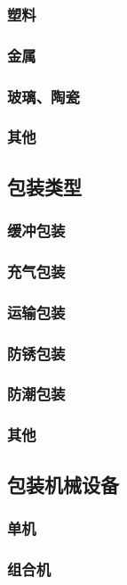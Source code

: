 \documentclass[UTF8]{../../ApplicationUniverse}
\begin{document}
        \subsubsection{塑料}
        \subsubsection{金属}
        \subsubsection{玻璃、陶瓷}
        \subsubsection{其他}
    \subsection{包装类型}
        \subsubsection{缓冲包装}
        \subsubsection{充气包装}
        \subsubsection{运输包装}
        \subsubsection{防锈包装}
        \subsubsection{防潮包装}
        \subsubsection{其他}
    \subsection{包装机械设备}
        \subsubsection{单机}
        \subsubsection{组合机}
\end{document}

